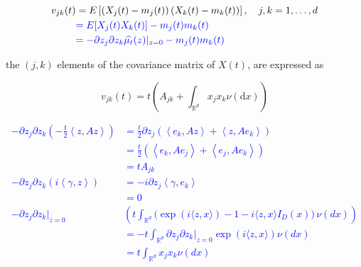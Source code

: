 \documentclass[a4paper,11pt]{article}
\begin{document}
\begin{align*}
    v_{j k}(t) & =E\left[\left(X_{j}(t)-m_{j}(t)\right)\left(X_{k}(t)-m_{k}(t)\right)\right], \quad j, k=1, \ldots, d \\
               & \textcolor{blue}{= E[X_{j}(t)X_{k}(t)] - m_{j}(t)m_{k}(t)}                                           \\
               & \textcolor{blue}{ = -\partial z_{j} \partial z_{k} \widehat{\mu_{t}}(z)|_{z=0} - m_{j}(t)m_{k}(t)}
\end{align*}

the $(j, k)$ elements of the covariance matrix of $X(t)$, are expressed as


\begin{equation*}
    v_{j k}(t)=t\left(A_{j k}+\int_{\mathbb{R}^{d}} x_{j} x_{k} \nu(\mathrm{d} x)\right) \tag{25:8}
\end{equation*}

\textcolor{blue}{
    \begin{align*}
        -\partial z_{j} \partial z_{k} \left( -\frac{t}{2} \left< z,Az \right> \right) & =
        \frac{t}{2}\partial z_{j} \left( \left<e_{k}, Az \right> + \left<z , Ae_{k} \right>  \right)                                                                                                                                            \\
                                                                                       & = \frac{t}{2} \left( \left<e_{k}, Ae_{j} \right> + \left<e_{j} , Ae_{k} \right>  \right)                                                               \\
                                                                                       & = tA_{jk}                                                                                                                                              \\
        -\partial z_{j} \partial z_{k} \left(  i\left< \gamma,z \right> \right)        & = -i \partial z_{j} \left< \gamma, e_{k} \right>                                                                                                       \\
                                                                                       & = 0                                                                                                                                                    \\
        -\partial z_{j} \partial z_{k}|_{z=0}                                          & \left(t \int_{\mathbb{R}^{d}} \bigl( \operatorname{e x p} ( i \langle z, x \rangle)-1-i \langle z, x \rangle I_{D} ( x ) \bigr) \, \nu( d x )  \right) \\
                                                                                       & = -t\int_{\mathbb{R}^{d}}  \partial z_{j} \partial z_{k} |_{z=0}\operatorname{e x p} ( i \langle z, x \rangle) \nu( d x )                              \\
                                                                                       & = t\int_{\mathbb{R}^{d}} x_{j} x_{k} \nu( d x )
    \end{align*}
}
\end{document}
